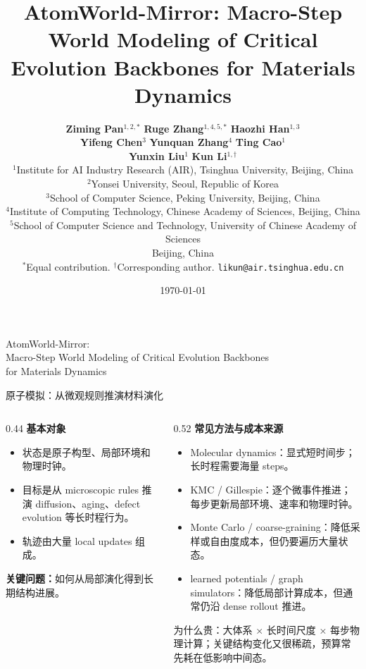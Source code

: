 \documentclass[aspectratio=43,10pt]{beamer}
\title{AtomWorld-Mirror: Macro-Step World Modeling of Critical Evolution Backbones for Materials Dynamics}
\subtitle{}
\author{%
  \normalfont
  \textbf{Ziming Pan}$^{1,2,*}$ \quad
  \textbf{Ruge Zhang}$^{1,4,5,*}$ \quad
  \textbf{Haozhi Han}$^{1,3}$\\
  \textbf{Yifeng Chen}$^{3}$ \quad
  \textbf{Yunquan Zhang}$^{4}$ \quad
  \textbf{Ting Cao}$^{1}$\\
  \textbf{Yunxin Liu}$^{1}$ \quad
  \textbf{Kun Li}$^{1,\dagger}$\\[0.18cm]
  {\scriptsize $^1$Institute for AI Industry Research (AIR), Tsinghua University, Beijing, China}\\
  {\scriptsize $^2$Yonsei University, Seoul, Republic of Korea}\\
  {\scriptsize $^3$School of Computer Science, Peking University, Beijing, China}\\
  {\scriptsize $^4$Institute of Computing Technology, Chinese Academy of Sciences, Beijing, China}\\
  {\scriptsize $^5$School of Computer Science and Technology, University of Chinese Academy of Sciences}\\
  {\scriptsize Beijing, China}\\
  {\scriptsize $^*$Equal contribution. \quad $^\dagger$Corresponding author. \quad \texttt{likun@air.tsinghua.edu.cn}}
}
\institute{}
\date{\today}
\newcommand{\hl}[1]{\textcolor{thuPurple}{\textbf{#1}}}
\newcommand{\smallgray}[1]{{\scriptsize\textcolor{muted}{#1}}}
\newcommand{\tightitems}{\setlength{\itemsep}{0.35em}}
\begin{document}
{
\begin{frame}[plain]
  \begin{center}
    \vspace{0.70cm}
    {\color{thuPurple}\Large AtomWorld-Mirror:\\[0.12cm]
    Macro-Step World Modeling of Critical Evolution Backbones\\
    for Materials Dynamics\par}
    \vspace{0.48cm}
    {\small \insertauthor\par}
  \end{center}
\end{frame}
}

\begin{frame}{原子模拟：从微观规则推演材料演化}
  \small
  \begin{columns}[T,onlytextwidth]
    \begin{column}{0.44\textwidth}
      \textbf{基本对象}
      \begin{itemize}
        \tightitems
        \item 状态是原子构型、局部环境和物理时钟。
        \item 目标是从 microscopic rules 推演 diffusion、aging、defect evolution 等长时程行为。
        \item 轨迹由大量 local updates 组成。
      \end{itemize}
      \vspace{0.35cm}
      \hl{关键问题：}如何从局部演化得到长期结构进展。
    \end{column}
    \begin{column}{0.52\textwidth}
      \textbf{常见方法与成本来源}
      \begin{itemize}
        \tightitems
        \item Molecular dynamics：显式短时间步；长时程需要海量 steps。
        \item KMC / Gillespie：逐个微事件推进；每步更新局部环境、速率和物理时钟。
        \item Monte Carlo / coarse-graining：降低采样或自由度成本，但仍要遍历大量状态。
        \item learned potentials / graph simulators：降低局部计算成本，但通常仍沿 dense rollout 推进。
      \end{itemize}
      \vspace{0.25cm}
      \smallgray{为什么贵：大体系 × 长时间尺度 × 每步物理计算；关键结构变化又很稀疏，预算常先耗在低影响中间态。}
    \end{column}
  \end{columns}
\end{frame}
\end{document}
